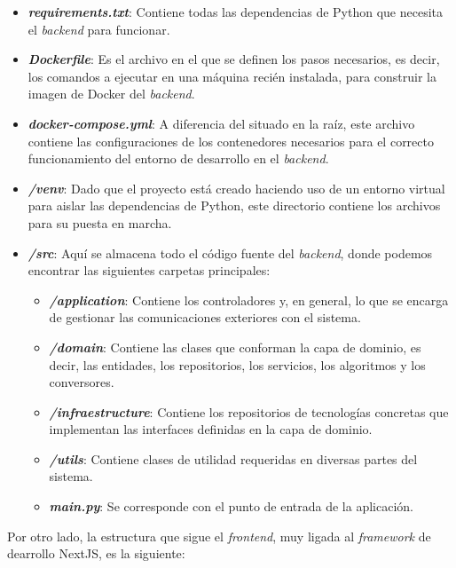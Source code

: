 \begin{itemize}
	\item \textbf{\textit{requirements.txt}}: Contiene todas las dependencias de Python que necesita el \textit{backend} para funcionar.
	\item \textbf{\textit{Dockerfile}}: Es el archivo en el que se definen los pasos necesarios, es decir, los comandos a ejecutar en una
	      máquina recién instalada, para construir la imagen de Docker del \textit{backend}.
	\item \textbf{\textit{docker-compose.yml}}: A diferencia del situado en la raíz, este archivo contiene las configuraciones de los contenedores necesarios
	      para el correcto funcionamiento del entorno de desarrollo en el \textit{backend}.
	\item \textbf{\textit{/venv}}: Dado que el proyecto está creado haciendo uso de un entorno virtual para aislar las dependencias de Python, este directorio
	      contiene los archivos para su puesta en marcha.
	\item \textbf{\textit{/src}}: Aquí se almacena todo el código fuente del \textit{backend}, donde podemos encontrar las siguientes carpetas principales:
	      \begin{itemize}
		      \item \textbf{\textit{/application}}: Contiene los controladores y, en general, lo que se encarga de gestionar las comunicaciones exteriores con el sistema.
		      \item \textbf{\textit{/domain}}: Contiene las clases que conforman la capa de dominio, es decir, las entidades, los repositorios, los servicios, los algoritmos
		            y los conversores.
		      \item \textbf{\textit{/infraestructure}}: Contiene los repositorios de tecnologías concretas que implementan las interfaces definidas en la capa de dominio.
		      \item \textbf{\textit{/utils}}: Contiene clases de utilidad requeridas en diversas partes del sistema.
		      \item \textbf{\textit{main.py}}: Se corresponde con el punto de entrada de la aplicación.
	      \end{itemize}
\end{itemize}

\bigskip
Por otro lado, la estructura que sigue el \textit{frontend}, muy ligada al \textit{framework} de dearrollo NextJS, es la siguiente:

